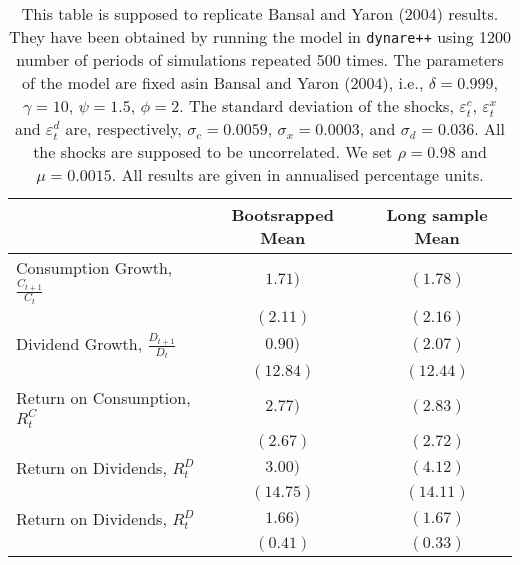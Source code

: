 \begin{table}[h!]
\captionsetup{font=small, width=0.75\textwidth}
\caption{This table is supposed to replicate Bansal and Yaron (2004) results. They have been obtained by running the model in \texttt{dynare++} using 1200 number of periods of simulations repeated 500 times. The parameters of the model are fixed asin Bansal and Yaron (2004), i.e., $\delta = 0.999$, $\gamma = 10$, $\psi = 1.5$, $\phi = 2$. The standard deviation of the shocks, $\varepsilon_t^c$, $\varepsilon_t^x$ and $\varepsilon_t^d$ are, respectively, $\sigma_c = 0.0059$, $\sigma_x = 0.0003$, and $\sigma_d = 0.036$. All the shocks are supposed to be uncorrelated. We set $\rho = 0.98$ and $\mu = 0.0015$. All results are given in annualised percentage units.} \vspace{0.25cm}
\centering
\def\arraystretch{1.5}
\begin{tabular}{l|cc}
\hline
 & Bootsrapped Mean & Long sample Mean \\
\toprule
Consumption Growth, $\frac{C_{t+1}}{C_t}$ & $ 1.71 )$ & $( 1.78 )$ \\    & $(  2.11 )$ & $(  2.16 )$ \\  Dividend Growth, $\frac{D_{t+1}}{D_t}$ & $ 0.90 )$ & $( 2.07 )$ \\    & $( 12.84 )$ & $( 12.44 )$ \\  Return on Consumption, $R_t^{C}$ & $ 2.77 )$ & $( 2.83 )$ \\    & $(  2.67 )$ & $(  2.72 )$ \\  Return on Dividends, $R_t^D$ & $ 3.00 )$ & $( 4.12 )$ \\    & $( 14.75 )$ & $( 14.11 )$ \\  Return on Dividends, $R_t^D$ & $ 1.66 )$ & $( 1.67 )$ \\    & $(  0.41 )$ & $(  0.33 )$ \\  \bottomrule
\end{tabular}
\end{table}
